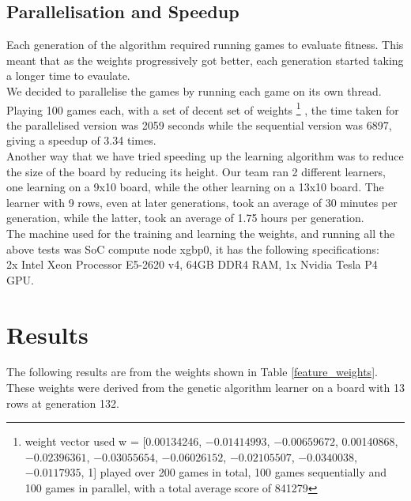 \documentclass[a4paper,12pt,twocolumn]{article}
\begin{document}
\subsection{Parallelisation and Speedup}
\label{parallelisation_n_speedup}
Each generation of the algorithm required running games to evaluate fitness. This
meant that as the weights progressively got better, each generation started
taking a longer time to evaulate.\\

We decided to parallelise the games by running each game on its own thread. Playing
100 games each, with a set of decent set of weights
\footnote{
    weight vector used w = [0.00134246, $-0.01414993$, $-0.00659672$, 0.00140868, $-0.02396361$, $-0.03055654$, $-0.06026152$, $-0.02105507$, $-0.0340038$, $-0.0117935$, 1]
    played over 200 games in total, 100 games sequentially and 100 games in parallel, with a total average score of 841279
}
, the time taken for the parallelised version was 2059 seconds while the
sequential version was 6897, giving a speedup of 3.34 times.\\

Another way that we have tried speeding up the learning algorithm was to reduce
the size of the board by reducing its height. Our team ran 2 different learners,
one learning on a 9x10 board, while the other learning on a 13x10 board.
The learner with 9 rows, even at later generations, took an average of 30 minutes
per generation, while the latter, took an average of 1.75 hours per generation.\\

The machine used for the training and learning the weights, and running all the
above tests was SoC compute node xgbp0, it has the following specifications:\\

2x Intel Xeon Processor E5-2620 v4, 64GB DDR4 RAM, 1x Nvidia Tesla P4 GPU.

\section{Results}
The following results are from the weights shown in Table \ref{feature_weights}.
These weights were derived from the genetic algorithm learner on a board with 13 rows
at generation 132.\\
\end{document}
